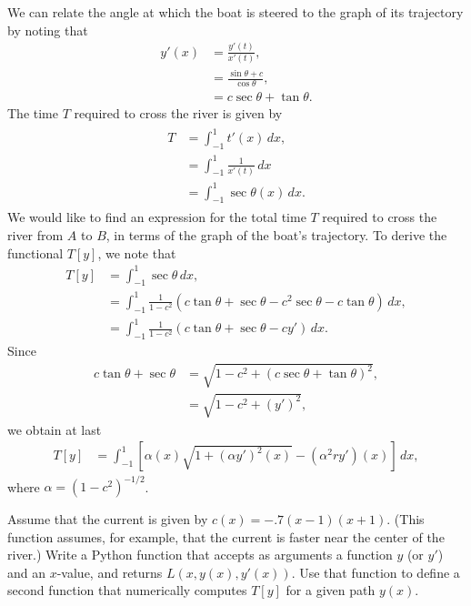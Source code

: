 We can relate the angle at which the boat is steered to the graph of its trajectory by noting that 
\begin{align*}
	y'(x) &= \frac{y'(t)}{x'(t)} ,\\
	&= \frac{\sin \theta + c}{\cos \theta},\\
	&= c\sec \theta + \tan \theta .%
\end{align*}
The time $T$ required to cross the river is given by
\begin{align}
\begin{split}
	T &= \int_{-1}^1 t'(x)\, dx, \\
	&= \int_{-1}^1 \frac{1}{x'(t)}\, dx \\ 
	&= \int_{-1}^1 \sec \theta (x)\, dx. 
\end{split}\label{rivercrossing:T}
\end{align}
We would like to find an expression for the total time $T$ required to cross the river from $A$ to $B$, in terms of the graph of the boat's trajectory. 
To derive the functional $T[y]$, we note that 
\begin{align*}
	T[y] &= \int_{-1}^1 \sec \theta\, dx,\\
	&= \int_{-1}^1 \frac{1}{1-c^2}(c \tan \theta + \sec \theta -c^2 \sec \theta - c\tan \theta)\, dx, \\
	&= \int_{-1}^1 \frac{1}{1-c^2}(c \tan \theta + \sec \theta -c y' )\, dx.	
\end{align*}
Since 
\begin{align*}
	c\tan \theta + \sec \theta &= \sqrt{1 - c^2 + (c \sec \theta + \tan \theta)^2},\\
	&= \sqrt{1 - c^2 + (y')^2},
\end{align*}
we obtain at last
\begin{align}
	T[y] &= \int_{-1}^1 \left[ \alpha(x)\sqrt{1 + (\alpha y')^2(x)} - (\alpha^2 r y')(x) \right]\, dx,
\end{align}
where $\alpha = (1 - c^2)^{-1/2}$.

\begin{problem}
Assume that the current is given by $c(x) = -.7(x-1)(x+1)$. (This function assumes, for example, that the current is faster near the center of the river.)
Write a Python function that accepts as arguments a function $y$ (or $y'$) and an $x$-value, and returns $L(x,y(x),y'(x))$. Use that function to define a second function that numerically computes $T[y]$ for a given path $y(x)$.
\end{problem}

